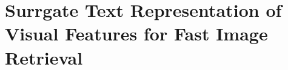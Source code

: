 
\graphicspath{{img/srt/}}

\chapter{Surrgate Text Representation of Visual Features for Fast Image Retrieval}
\label{ch:srt}